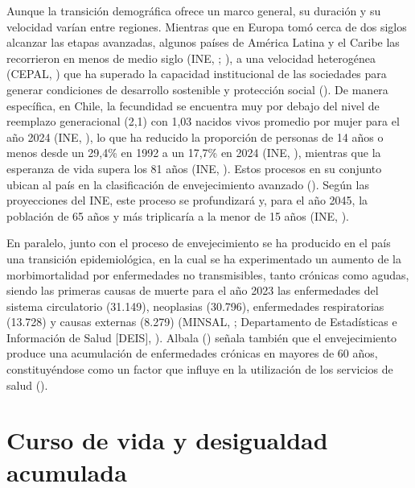 \documentclass[
  spanish,
  a4paper,
  oneside]{scrbook}
\begin{document}
Aunque la transición demográfica ofrece un marco general, su duración y
su velocidad varían entre regiones. Mientras que en Europa tomó cerca de
dos siglos alcanzar las etapas avanzadas, algunos países de América
Latina y el Caribe las recorrieron en menos de medio siglo (INE,
;
),
a una velocidad heterogénea (CEPAL,
) que ha superado la capacidad
institucional de las sociedades para generar condiciones de desarrollo
sostenible y protección social
(). De
manera específica, en Chile, la fecundidad se encuentra muy por debajo
del nivel de reemplazo generacional (2,1) con 1,03 nacidos vivos
promedio por mujer para el año 2024 (INE,
), lo que ha reducido la proporción
de personas de 14 años o menos desde un 29,4\% en 1992 a un 17,7\% en
2024 (INE, ), mientras que la
esperanza de vida supera los 81 años (INE,
). Estos procesos en su conjunto
ubican al país en la clasificación de envejecimiento avanzado
(). Según
las proyecciones del INE, este proceso se profundizará y, para el año
2045, la población de 65 años y más triplicaría a la menor de 15 años
(INE, ).

En paralelo, junto con el proceso de envejecimiento se ha producido en
el país una transición epidemiológica, en la cual se ha experimentado un
aumento de la morbimortalidad por enfermedades no transmisibles, tanto
crónicas como agudas, siendo las primeras causas de muerte para el año
2023 las enfermedades del sistema circulatorio (31.149), neoplasias
(30.796), enfermedades respiratorias (13.728) y causas externas (8.279)
(MINSAL, ; Departamento de
Estadísticas e Información de Salud {[}DEIS{]},
). Albala
() señala también que el
envejecimiento produce una acumulación de enfermedades crónicas en
mayores de 60 años, constituyéndose como un factor que influye en la
utilización de los servicios de salud
().

\section{Curso de vida y desigualdad
acumulada}\label{curso-de-vida-y-desigualdad-acumulada}
\end{document}
